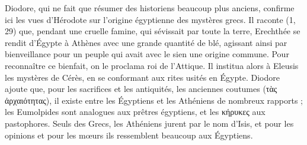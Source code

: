 \documentclass[letterpaper,twocolumn,openany,nodeprecatedcode]{dndbook}
\begin{document}
Diodore, qui ne fait que résumer des historiens beaucoup plus anciens, confirme ici les vues d'Hérodote sur l'origine égyptienne des mystères grecs. Il raconte (1, 29) que, pendant une cruelle famine, qui sévissait par toute la terre, Erechthée se rendit d'Égypte à Athènes avec une grande quantité de blé, agissant ainsi par bienveillance pour un peuple qui avait avec le sien une origine commune. Pour reconnaître ce bienfait, on le proclama roi de l'Attique. Il institua alors à Eleusis les mystères de Cérès, en se conformant aux rites usités en Égypte. Diodore ajoute que, pour les sacrifices et les antiquités, les anciennes coutumes (τὰς ἀρχαιότητας), il existe entre les Égyptiens et les Athéniens de nombreux rapports ; les Eumolpides sont analogues aux prêtres égyptiens, et les κήρυκες aux pastophores. Seuls des Grecs, les Athéniens jurent par le nom d'Isis, et pour les opinions et pour les mœurs ils ressemblent beaucoup aux Égyptiens.
\end{document}
